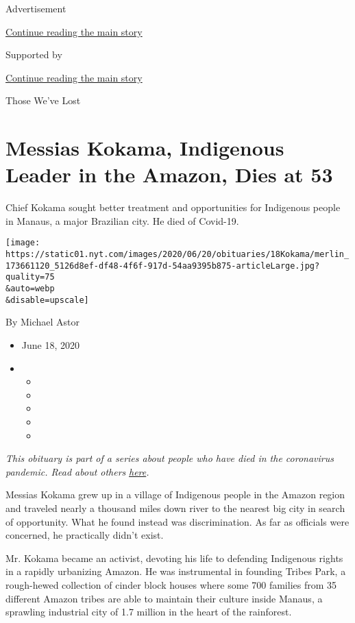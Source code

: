 Advertisement

\protect\hyperlink{after-top}{Continue reading the main story}

Supported by

\protect\hyperlink{after-sponsor}{Continue reading the main story}

Those We've Lost

\hypertarget{messias-kokama-indigenous-leader-in-the-amazon-dies-at-53}{%
\section{Messias Kokama, Indigenous Leader in the Amazon, Dies at
53}\label{messias-kokama-indigenous-leader-in-the-amazon-dies-at-53}}

Chief Kokama sought better treatment and opportunities for Indigenous
people in Manaus, a major Brazilian city. He died of Covid-19.

\texttt{[image: https://static01.nyt.com/images/2020/06/20/obituaries/18Kokama/merlin\_173661120\_5126d8ef-df48-4f6f-917d-54aa9395b875-articleLarge.jpg?quality=75\\\&auto=webp\\\&disable=upscale]}

By Michael Astor

\begin{itemize}
\item
  June 18, 2020
\item
  \begin{itemize}
  \item
  \item
  \item
  \item
  \item
  \end{itemize}
\end{itemize}

\emph{This obituary is part of a series about people who have died in
the coronavirus pandemic. Read about others}
\href{https://www.nytimes.com/interactive/2020/obituaries/people-died-coronavirus-obituaries.html}{\emph{here}}\emph{.}

Messias Kokama grew up in a village of Indigenous people in the Amazon
region and traveled nearly a thousand miles down river to the nearest
big city in search of opportunity. What he found instead was
discrimination. As far as officials were concerned, he practically
didn't exist.

Mr. Kokama became an activist, devoting his life to defending Indigenous
rights in a rapidly urbanizing Amazon. He was instrumental in founding
Tribes Park, a rough-hewed collection of cinder block houses where some
700 families from 35 different Amazon tribes are able to maintain their
culture inside Manaus, a sprawling industrial city of 1.7 million in the
heart of the rainforest.

